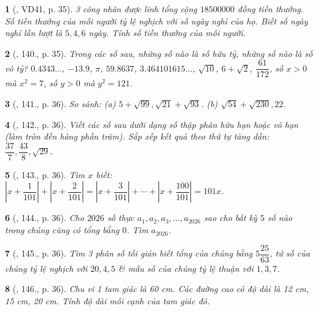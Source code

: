 \documentclass{article}
\newtheorem{baitoan}{}
\begin{document}
\begin{baitoan}[\cite{Tuyen_Toan_7}, VD41, p. 35]
	3 công nhân được lĩnh tổng cộng $18 500 000$ đồng tiền thưởng. Số tiền thưởng của mỗi người tỷ lệ nghịch với số ngày nghỉ của họ. Biết số ngày nghỉ lần lượt là $5,4,6$ ngày. Tính số tiền thưởng của mỗi người.
\end{baitoan}

\begin{baitoan}[\cite{Tuyen_Toan_7}, 140., p. 35]
	Trong các số sau, những số nào là số hữu tỷ, những số nào là số vô tỷ? $0.4343\ldots$, $-13.9$, $\pi$, $59.8637$, $3.464101615\ldots$, $\sqrt{10}$, $6 + \sqrt{2}$, $\dfrac{61}{172}$, số $x > 0$ mà $x^2 = 7$, số $y > 0$ mà $y^2 = 121$.
\end{baitoan}

\begin{baitoan}[\cite{Tuyen_Toan_7}, 141., p. 36]
	So sánh: (a) $5 + \sqrt{99},\sqrt{21} + \sqrt{93}$. (b) $\sqrt{54} + \sqrt{230},22$.	
\end{baitoan}

\begin{baitoan}[\cite{Tuyen_Toan_7}, 142., p. 36]
	Viết các số sau dưới dạng số thập phân hữu hạn hoặc vô hạn (làm tròn đến hàng phần trăm). Sắp xếp kết quả theo thứ tự tăng dần: $\dfrac{37}{7},\dfrac{43}{8},\sqrt{29}$.
\end{baitoan}

\begin{baitoan}[\cite{Tuyen_Toan_7}, 143., p. 36]
	Tìm $x$ biết: $\left|x + \dfrac{1}{101}\right| + \left|x + \dfrac{2}{101}\right| = \left|x + \dfrac{3}{101}\right| + \cdots + \left|x + \dfrac{100}{101}\right| = 101x$.
\end{baitoan}

\begin{baitoan}[\cite{Tuyen_Toan_7}, 144., p. 36]
	Cho $2026$ số thực $a_1,a_2,a_3,\ldots,a_{2026}$ sao cho bất kỳ $5$ số nào trong chúng cũng có tổng bằng $0$. Tìm $a_{2026}$.
\end{baitoan}

\begin{baitoan}[\cite{Tuyen_Toan_7}, 145., p. 36]
	Tìm 3 phân số tối giản biết tổng của chúng bằng $5\dfrac{25}{63}$, tử số của chúng tỷ lệ nghịch với $20,4,5$ \& mẫu số của chúng tỷ lệ thuận với $1,3,7$.
\end{baitoan}

\begin{baitoan}[\cite{Tuyen_Toan_7}, 146., p. 36]
	Chu vi 1 tam giác là {\rm60 cm}. Các đường cao có độ dài là {\rm12 cm, 15 cm, 20 cm}. Tính độ dài mỗi cạnh của tam giác đó.
\end{baitoan}
\end{document}
